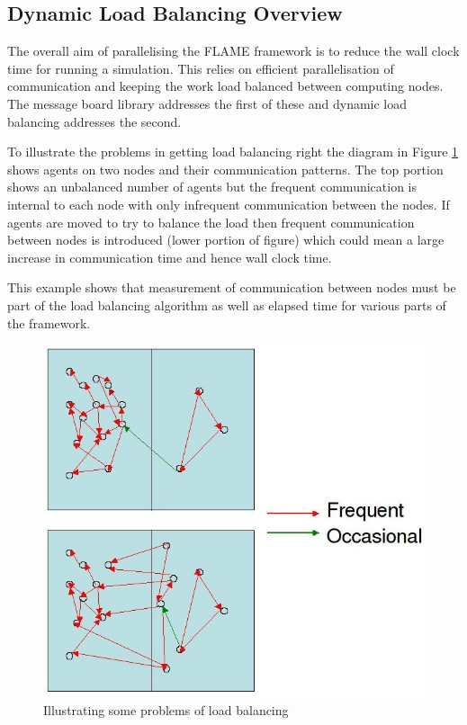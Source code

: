 \subsection{Dynamic Load Balancing Overview}

The overall aim of parallelising the FLAME framework is to reduce the wall clock time for running a simulation. This relies on efficient parallelisation of communication and keeping the work load balanced between computing nodes. The message board library addresses the first of these and dynamic load balancing addresses the second.

To illustrate the problems in getting load balancing right the diagram in Figure \ref{fig:load_balance_problem} shows agents on two nodes and their communication patterns. The top portion shows an unbalanced number of agents but the frequent communication is internal to each node with only infrequent communication between the nodes. If agents are moved to try to balance the load then frequent communication between nodes is introduced (lower portion of figure) which could mean a large increase in communication time and hence wall clock time. 

This example shows that measurement of communication between nodes must be part of the load balancing algorithm as well as elapsed time for various parts of the framework.

\begin{figure}[h]
 \centering
  \includegraphics[scale=0.50]{load_balance.jpg}
 \caption{Illustrating some problems of load balancing}
 \label{fig:load_balance_problem}
\end{figure}

